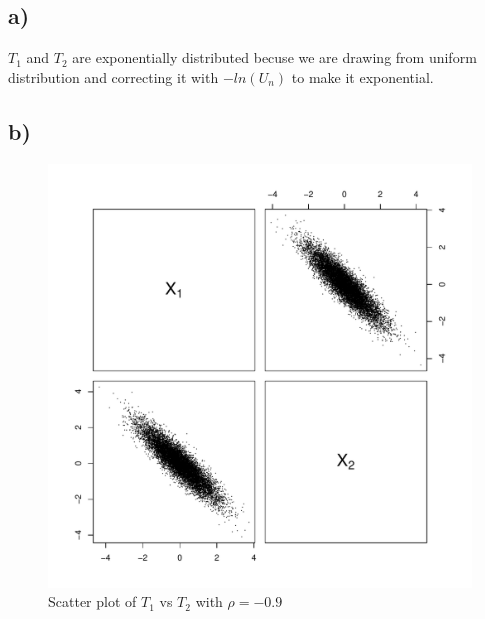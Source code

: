\documentclass[a4paper, 11pt]{article}
\begin{document}
\subsection*{a)}
$T_1$  and $T_2$ are exponentially distributed becuse we are drawing from uniform distribution and correcting it with $-ln(U_n)$ to make it exponential.

\subsection*{b)}

\begin{figure}[H]
  \centering
  \includegraphics[scale=0.7,page=2]{Rplots4.pdf}
  \caption{Scatter plot of $T_1$ vs $T_2$ with $\rho = -0.9$}
  \label{t1t2neg}
\end{figure}
\end{document}
